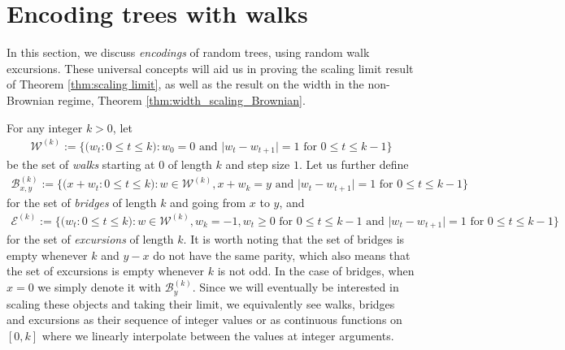 \documentclass{article}
\newcommand{\1}{\mathbbm{1}}								%
\theoremstyle{definition}
\numberwithin{equation}{section}
\newcommand{\cB}{\mathcal B}
\newcommand{\cE}{\mathcal E}
\newcommand{\cW}{\mathcal W}
\begin{document}

\section{Encoding trees with walks}\label{sec:prelims}

In this section, we discuss \emph{encodings} of random trees, using random walk excursions. These universal concepts will aid us in proving the scaling limit result of Theorem \ref{thm:scaling limit}, as well as the result on the width in the non-Brownian regime, Theorem \ref{thm:width_scaling_Brownian}. 

For any integer $k>0$, let
\begin{align*}
    \cW^{(k)}:=\Big\{\big(w_t:0\leq t\leq k\big):w_0=0\textrm{ and }\big|w_t-w_{t+1}\big|=1{\textrm{ for }0\le t \le k-1}\Big\}
\end{align*}
be the set of \emph{walks} starting at $0$ of length $k$ and step size $1$.
Let us further define
\begin{align*}
    \cB^{(k)}_{x,y}:=\Big\{\big(x+w_t:0\leq t\leq k\big):w\in \cW^{(k)},x+w_k=y\textrm{ and }\big|w_t-w_{t+1}\big|=1{\textrm{ for }0\le t \le k-1}\Big\}
\end{align*}
for the set of \emph{bridges} of length $k$ and going from $x$ to $y$, and
\begin{align*}
    \cE^{(k)}:=\Big\{\big(w_t:0\leq t\leq k\big):w\in \cW^{(k)},w_k=-1, w_t\geq0\textrm{ for }0\leq t\leq k-1 \textrm{ and }\big|w_t-w_{t+1}\big|=1{\textrm{ for }0\le t \le k-1}\Big\}
\end{align*}
for the set of \emph{excursions} of length $k$.
It is worth noting that the set of bridges is empty whenever $k$ and $y-x$ do not have the same parity, which also means that the set of excursions is empty whenever $k$ is not odd.
In the case of bridges, when $x=0$ we simply denote it with $\cB^{(k)}_y$.
Since we will eventually be interested in scaling these objects and taking their limit, we equivalently see walks, bridges and excursions as their sequence of integer values or as continuous functions on $[0,k]$ where we linearly interpolate between the values at integer arguments.
\end{document}

